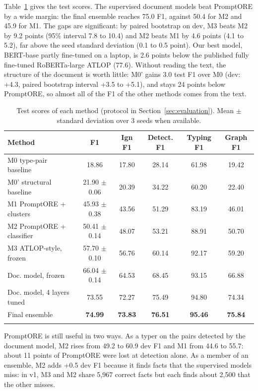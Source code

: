 \documentclass[pdflatex,sn-mathphys-num]{sn-jnl}
\begin{document}
Table~\ref{tab:main} gives the test scores. The supervised document models beat PromptORE by a wide margin: the final ensemble reaches 75.0 F1, against 50.4 for M2 and 45.9 for M1. The gaps are significant: by paired bootstrap on dev, M3 beats M2 by 9.2 points (95\% interval 7.8 to 10.4) and M2 beats M1 by 4.6 points (4.1 to 5.2), far above the seed standard deviation (0.1 to 0.5 point). Our best model, BERT-base partly fine-tuned on a laptop, is 2.6 points below the published fully fine-tuned RoBERTa-large ATLOP (77.6). Without reading the text, the structure of the document is worth little: M0' gains 3.0 test F1 over M0 (dev: +4.3, paired bootstrap interval +3.5 to +5.1), and stays 24 points below PromptORE, so almost all of the F1 of the other methods comes from the text.

\begin{table}[htbp]
\caption{Test scores of each method (protocol in Section~\ref{sec:evaluation}). Mean $\pm$ standard deviation over 3 seeds when available.}\label{tab:main}
\centering
\begin{tabular}{@{}lccccc@{}}
\toprule
Method & F1 & Ign F1 & Detect. F1 & Typing F1 & Graph F1 \\
\midrule
M0 type-pair baseline & 18.86 & 17.80 & 28.14 & 61.98 & 19.42 \\
M0' structural baseline & 21.90 $\pm$ 0.06 & 20.39 & 34.22 & 60.20 & 22.40 \\
M1 PromptORE + clusters & 45.93 $\pm$ 0.38 & 43.56 & 51.29 & 83.19 & 46.01 \\
M2 PromptORE + classifier & 50.41 $\pm$ 0.14 & 48.07 & 53.21 & 88.91 & 50.70 \\
M3 ATLOP-style, frozen & 57.70 $\pm$ 0.10 & 56.76 & 60.14 & 92.17 & 59.20 \\
Doc. model, frozen & 66.04 $\pm$ 0.14 & 64.53 & 68.45 & 93.15 & 66.88 \\
Doc. model, 4 layers tuned & 73.55 & 72.27 & 75.49 & 94.80 & 74.34 \\
Final ensemble & \textbf{74.99} & \textbf{73.83} & \textbf{76.51} & \textbf{95.46} & \textbf{75.84} \\
\botrule
\end{tabular}
\end{table}

PromptORE is still useful in two ways. As a typer on the pairs detected by the document model, M2 rises from 49.2 to 60.9 dev F1 and M1 from 44.6 to 55.7: about 11 points of PromptORE were lost at detection alone. As a member of an ensemble, M2 adds +0.5 dev F1 because it finds facts that the supervised models miss: in v1, M3 and M2 share 5,967 correct facts but each finds about 2,500 that the other misses.
\end{document}
